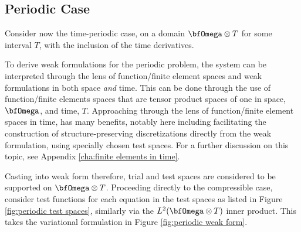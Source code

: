 \subsection*{Periodic Case}


    Consider now the time-periodic case, on a domain $\bfOmega\otimes T$ for some interval $T$, with the inclusion of the time derivatives.
    
     To derive weak formulations for the periodic problem, the system can be interpreted through the lens of function/finite element spaces and weak formulations in both space \emph{and} time. This can be done through the use of function/finite elements spaces that are tensor product spaces of one in space, $\bfOmega$, and time, $T$. Approaching through the lens of function/finite element spaces in time, has many benefits, notably here including facilitating the construction of structure-preserving discretizations directly from the weak formulation, using specially chosen test spaces. For a further discussion on this topic, see Appendix \ref{cha:finite elements in time}. 

    Casting into weak form therefore, trial and test spaces are considered to be supported on $\bfOmega\otimes T$. Proceeding directly to the compressible case, consider test functions for each equation in the test spaces as listed in Figure \ref{fig:periodic test spaces}, similarly via the $L^{2}(\bfOmega\otimes T)$ inner product. This takes the variational formulation in Figure \ref{fig:periodic weak form}.
    

